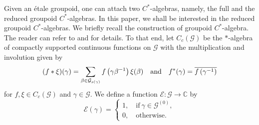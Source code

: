 \documentclass[a4paper,11pt,reqno]{amsart}
\theoremstyle{plain}
\theoremstyle{named}
\numberwithin{equation}{section}
\begin{document}
			Given an {\'e}tale groupoid, one can attach two \(C^*\)-algebras, namely, the full and the reduced groupoid \(C^*\)-algebras. In this paper, we shall be interested in the reduced groupoid $C^{\ast}$-algebras. We briefly recall the construction of groupoid \(C^*\)-algebra. The reader can refer to \cite[Section 5.6]{brownc} and \cite[Section 2]{Weygandt-2024-Rapid-decay-for-etale-gpd} for details. To that end, let $C_c (\mathcal G)$ be the $\ast$-algebra of compactly supported continuous functions on $\mathcal G$ with the multiplication and involution given by 
			\[
			 (f \ast \xi) (\gamma) = \sum\limits_{\beta \in \mathcal G_{s(\gamma)}} f \left (\gamma \beta^{-1} \right ) \xi (\beta) \quad \textup{and} \quad f^{\ast} (\gamma) = \overline {f \left (\gamma^{-1} \right )}
			\]
			for $f, \xi \in C_c (\mathcal G)$ and $\gamma \in \mathcal G$. We define a function $\mathcal E \colon  \mathcal G \to \mathbb C$ by 
			\begin{equation}\label{eq:0} \mathcal E (\gamma) = \begin{cases} 1, \quad \text {if}\ \gamma \in \mathcal G^{(0)}, \\ 0, \quad \text {otherwise.} \end{cases}\end{equation}
			 
\end{document}
